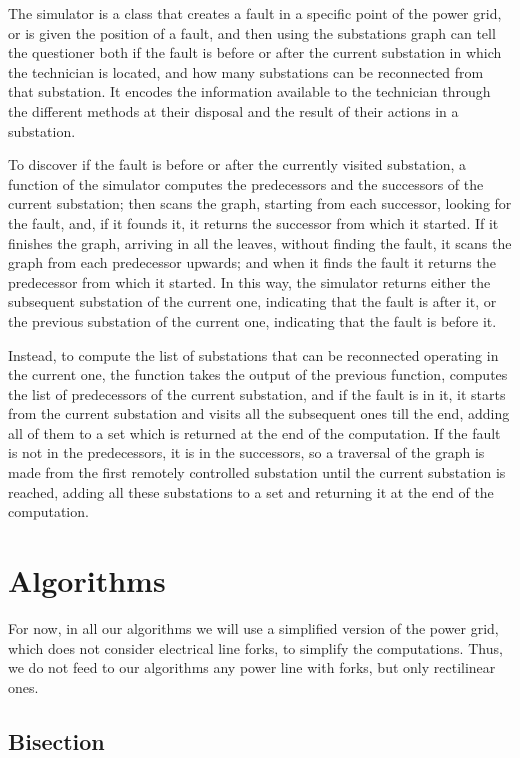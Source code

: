 The simulator is a class that creates a fault in a specific point of the power grid, or is given the position of a fault, and then using the substations graph can tell the questioner both if the fault is before or after the current substation in which the technician is located, and how many substations can be reconnected from that substation. It encodes the information available to the technician through the different methods at their disposal and the result of their actions in a substation.

To discover if the fault is before or after the currently visited substation, a function of the simulator computes the predecessors and the successors of the current substation; then scans the graph, starting from each successor, looking for the fault, and, if it founds it, it returns the successor from which it started. If it finishes the graph, arriving in all the leaves, without finding the fault, it scans the graph from each predecessor upwards; and when it finds the fault it returns the predecessor from which it started. In this way, the simulator returns either the subsequent substation of the current one, indicating that the fault is after it, or the previous substation of the current one, indicating that the fault is before it.

Instead, to compute the list of substations that can be reconnected operating in the current one, the function takes the output of the previous function, computes the list of predecessors of the current substation, and if the fault is in it, it starts from the current substation and visits all the subsequent ones till the end, adding all of them to a set which is returned at the end of the computation. If the fault is not in the predecessors, it is in the successors, so a traversal of the graph is made from the first remotely controlled substation until the current substation is reached, adding all these substations to a set and returning it at the end of the computation.


\section{Algorithms}


For now, in all our algorithms we will use a simplified version of the power grid, which does not consider electrical line forks, to simplify the computations. Thus, we do not feed to our algorithms any power line with forks, but only rectilinear ones.


\subsection{Bisection}

